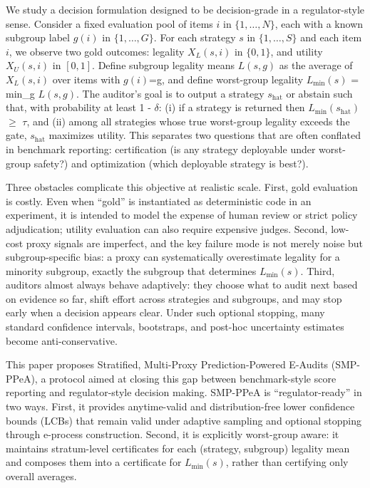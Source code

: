 \documentclass{article} %
\begin{document}
We study a decision formulation designed to be decision-grade in a regulator-style sense. Consider a fixed evaluation pool of items $i$ in $\{1,\ldots,N\}$, each with a known subgroup label $g(i)$ in $\{1,\ldots,G\}$. For each strategy $s$ in $\{1,\ldots,S\}$ and each item $i$, we observe two gold outcomes: legality $X_L(s,i)$ in $\{0,1\}$, and utility $X_U(s,i)$ in $[0,1]$. Define subgroup legality means $L(s,g)$ as the average of $X_L(s,i)$ over items with $g(i)$=g, and define worst-group legality $L_{\min}(s)$ = min_g $L(s,g)$. The auditor’s goal is to output a strategy $s_{\text{hat}}$ or abstain such that, with probability at least 1 - \ensuremath{\delta}: (i) if a strategy is returned then $L_{\min}(s_{\text{hat}})$ \ensuremath{\geq} \ensuremath{\tau}, and (ii) among all strategies whose true worst-group legality exceeds the gate, $s_{\text{hat}}$ maximizes utility. This separates two questions that are often conflated in benchmark reporting: certification (is any strategy deployable under worst-group safety?) and optimization (which deployable strategy is best?).

Three obstacles complicate this objective at realistic scale. First, gold evaluation is costly. Even when “gold” is instantiated as deterministic code in an experiment, it is intended to model the expense of human review or strict policy adjudication; utility evaluation can also require expensive judges. Second, low-cost proxy signals are imperfect, and the key failure mode is not merely noise but subgroup-specific bias: a proxy can systematically overestimate legality for a minority subgroup, exactly the subgroup that determines $L_{\min}(s)$. Third, auditors almost always behave adaptively: they choose what to audit next based on evidence so far, shift effort across strategies and subgroups, and may stop early when a decision appears clear. Under such optional stopping, many standard confidence intervals, bootstraps, and post-hoc uncertainty estimates become anti-conservative.

This paper proposes Stratified, Multi-Proxy Prediction-Powered E-Audits (SMP-PPeA), a protocol aimed at closing this gap between benchmark-style score reporting and regulator-style decision making. SMP-PPeA is “regulator-ready” in two ways. First, it provides anytime-valid and distribution-free lower confidence bounds (LCBs) that remain valid under adaptive sampling and optional stopping through e-process construction. Second, it is explicitly worst-group aware: it maintains stratum-level certificates for each (strategy, subgroup) legality mean and composes them into a certificate for $L_{\min}(s)$, rather than certifying only overall averages.
\end{document}
